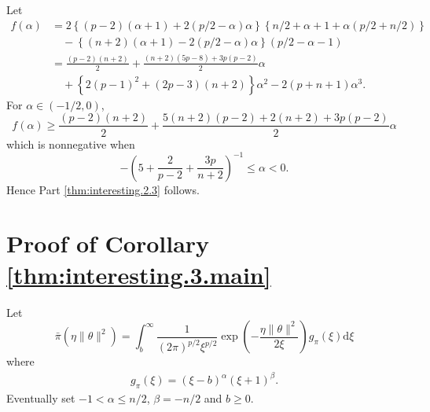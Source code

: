 \documentclass[preprint,11pt]{imsart}
\numberwithin{equation}{section}
\theoremstyle{plain}
\theoremstyle{definition}
\theoremstyle{remark}
\newcommand{\rd}{\mathrm{d}}
\begin{document}
Let
\begin{align*}
 f(\alpha)&=
2\left\{(p-2)(\alpha+1)+2(p/2-\alpha)\alpha\right\}\left\{n/2+\alpha+1+\alpha(p/2+n/2)\right\} \\
 & \quad - \left\{(n+2)(\alpha+1)-2(p/2-\alpha)\alpha\right\}\left(p/2-\alpha-1\right) \\
 &=\frac{(p-2)(n+2)}{2}+\frac{(n+2)(5p-8)+3p(p-2)}{2}\alpha \\
 &\quad + \left\{2(p-1)^2+(2p-3)(n+2)\right\}\alpha^2-2(p+n+1)\alpha^3.
\end{align*}
For $\alpha\in(-1/2,0)$,
\begin{equation*}
 f(\alpha)\geq \frac{(p-2)(n+2)}{2}+\frac{5(n+2)(p-2)+2(n+2)+3p(p-2)}{2}\alpha 
\end{equation*}
which is nonnegative when
\begin{equation*}
-\left(5+\frac{2}{p-2}+\frac{3p}{n+2}\right)^{-1} \leq \alpha <0.
\end{equation*}
Hence Part \ref{thm:interesting.2.3} follows.

 \section{Proof of Corollary \ref{thm:interesting.3.main}}
\label{sec.ap.2005}
Let 
\begin{equation*}
 \bar{\pi}(\eta\|\theta\|^2)=\int_b^\infty \frac{1}{(2\pi)^{p/2}\xi^{p/2}}
  \exp\left(-\frac{\eta\|\theta\|^2}{2\xi}\right)g_\pi(\xi)\rd \xi
\end{equation*}
where
\begin{align*}
 g_\pi(\xi)=(\xi- b)^\alpha(\xi+1)^\beta.
\end{align*}
Eventually set $ -1<\alpha\leq n/2$, $\beta=-n/2$ and $b\geq 0$.
\end{document}
